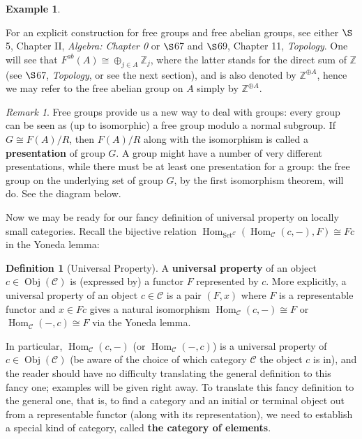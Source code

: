 \documentclass{article}
\theoremstyle{definition}
\newtheorem{definition}{Definition}[section]
\theoremstyle{definition}
\newtheorem{example}{Example}[section]
\theoremstyle{remark}
\newtheorem*{remark}{Remark}
\DeclareMathOperator{\Obj}{Obj}
\DeclareMathOperator{\Hom}{Hom}
\begin{document}
\begin{example}
\begin{enumerate}[label=(\roman*)]
	\end{enumerate}
	For an explicit construction for free groups and free abelian groups, see either $\S$5, Chapter II, \textsl{Algebra: Chapter 0} or $\S$67 and $\S$69, Chapter 11, \textsl{Topology}. One will see that $F^{ab}(A)\cong \oplus_{j\in A}\mathbb{Z}_j$, where the latter stands for the direct sum of $\mathbb{Z}$ (see $\S$67, \textsl{Topology}, or see the next section), and is also denoted by $\mathbb{Z}^{\oplus A}$, hence we may refer to the free abelian group on $A$ simply by $\mathbb{Z}^{\oplus A}$.
\end{example}

\begin{remark}
Free groups provide us a new way to deal with groups: every group can be seen as (up to isomorphic) a free group modulo a normal subgroup. If $G\cong F(A)/R$, then $F(A)/R$ along with the isomorphism is called a \textbf{presentation} of group $G$. A group might have a number of very different presentations, while there must be at least one presentation for a group: the free group on the underlying set of group $G$, by the first isomorphism theorem, will do. See the diagram below.
\begin{center}
\end{center}
\end{remark}
Now we may be ready for our fancy definition of universal property on locally small categories. Recall the bijective relation $\Hom_{\mathrm{Set}^{\mathcal{C}}}(\Hom_\mathcal{C}(c,-),F)\cong Fc$ in the Yoneda lemma:
\begin{definition}[Universal Property]
	A \textbf{universal property} of an object $c\in \Obj(\mathcal{C})$ is (expressed by) a functor $F$ represented by $c$. More explicitly, a universal property of an object $c\in \mathcal{C}$ is a pair $(F,x)$ where $F$ is a  representable functor and $x\in Fc$ gives a natural isomorphism $\Hom_\mathcal{C}(c,-)\cong F$ or $\Hom_\mathcal{C}(-,c)\cong F$ via the Yoneda lemma.
\end{definition}
In particular, $\Hom_\mathcal{C}(c,-)$ (or $\Hom_\mathcal{C}(-,c)$) is a universal property of $c\in \Obj(\mathcal{C})$ (be aware of the choice of which category $\mathcal{C}$ the object $c$ is in), and the reader should have no difficulty translating the general definition to this fancy one; examples will be given right away. To translate this fancy definition to the general one, that is, to find a category and an initial or terminal object out from a representable functor (along with its representation), we need to establish a special kind of category, called \textbf{the category of elements}. 
\end{document}
